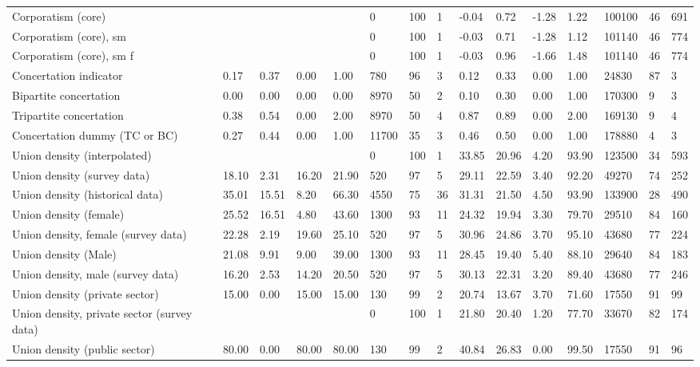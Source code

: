 \begin{longtable}{lllllllllllllll}
Corporatism (core) &  &  &  &  & 0 & 100 & 1 & -0.04 & 0.72 & -1.28 & 1.22 & 100100 & 46 & 691\\
\addlinespace
Corporatism (core), sm &  &  &  &  & 0 & 100 & 1 & -0.03 & 0.71 & -1.28 & 1.12 & 101140 & 46 & 774\\
Corporatism (core), sm f &  &  &  &  & 0 & 100 & 1 & -0.03 & 0.96 & -1.66 & 1.48 & 101140 & 46 & 774\\
Concertation indicator & 0.17 & 0.37 & 0.00 & 1.00 & 780 & 96 & 3 & 0.12 & 0.33 & 0.00 & 1.00 & 24830 & 87 & 3\\
Bipartite concertation & 0.00 & 0.00 & 0.00 & 0.00 & 8970 & 50 & 2 & 0.10 & 0.30 & 0.00 & 1.00 & 170300 & 9 & 3\\
Tripartite concertation & 0.38 & 0.54 & 0.00 & 2.00 & 8970 & 50 & 4 & 0.87 & 0.89 & 0.00 & 2.00 & 169130 & 9 & 4\\
\addlinespace
Concertation dummy (TC or BC) & 0.27 & 0.44 & 0.00 & 1.00 & 11700 & 35 & 3 & 0.46 & 0.50 & 0.00 & 1.00 & 178880 & 4 & 3\\
Union density (interpolated) &  &  &  &  & 0 & 100 & 1 & 33.85 & 20.96 & 4.20 & 93.90 & 123500 & 34 & 593\\
Union density (survey data) & 18.10 & 2.31 & 16.20 & 21.90 & 520 & 97 & 5 & 29.11 & 22.59 & 3.40 & 92.20 & 49270 & 74 & 252\\
Union density (historical data) & 35.01 & 15.51 & 8.20 & 66.30 & 4550 & 75 & 36 & 31.31 & 21.50 & 4.50 & 93.90 & 133900 & 28 & 490\\
Union density (female) & 25.52 & 16.51 & 4.80 & 43.60 & 1300 & 93 & 11 & 24.32 & 19.94 & 3.30 & 79.70 & 29510 & 84 & 160\\
\addlinespace
Union density, female (survey data) & 22.28 & 2.19 & 19.60 & 25.10 & 520 & 97 & 5 & 30.96 & 24.86 & 3.70 & 95.10 & 43680 & 77 & 224\\
Union density (Male) & 21.08 & 9.91 & 9.00 & 39.00 & 1300 & 93 & 11 & 28.45 & 19.40 & 5.40 & 88.10 & 29640 & 84 & 183\\
Union density, male (survey data) & 16.20 & 2.53 & 14.20 & 20.50 & 520 & 97 & 5 & 30.13 & 22.31 & 3.20 & 89.40 & 43680 & 77 & 246\\
Union density (private sector) & 15.00 & 0.00 & 15.00 & 15.00 & 130 & 99 & 2 & 20.74 & 13.67 & 3.70 & 71.60 & 17550 & 91 & 99\\
Union density, private sector (survey data) &  &  &  &  & 0 & 100 & 1 & 21.80 & 20.40 & 1.20 & 77.70 & 33670 & 82 & 174\\
\addlinespace
Union density (public sector) & 80.00 & 0.00 & 80.00 & 80.00 & 130 & 99 & 2 & 40.84 & 26.83 & 0.00 & 99.50 & 17550 & 91 & 96\\

\end{longtable}
